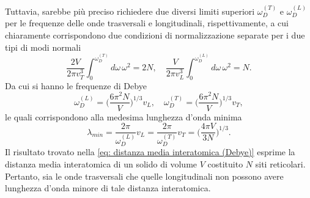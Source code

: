 Tuttavia, sarebbe più preciso richiedere due diversi limiti superiori $\omega_{D}^{(T)}$ e $\omega_D^{(L)}$ per le frequenze delle onde trasversali e longitudinali, rispettivamente, a cui chiaramente corrispondono due condizioni di normalizzazione separate per i due tipi di modi normali
\begin{equation}
    \frac{2V}{2\pi v_T^3}\int_0^{\omega_D^{(T)}}d\omega\,\omega^2 = 2N,\quad \frac{V}{2\pi v_L^3}\int_0^{\omega_D^{(L)}}d\omega\,\omega^2 = N.
\end{equation}
Da cui si hanno le frequenze di Debye
\begin{equation}
    \omega_D^{(L)} = \bigg(\frac{6\pi^2N}{V}\bigg)^{1/3}v_L,\quad \omega_D^{(T)} = \bigg(\frac{6\pi^2N}{V}\bigg)^{1/3}v_T,
\end{equation}
le quali corrispondono alla medesima lunghezza d'onda minima 
\begin{equation}
\label{eq: distanza media interatomica (Debye)}
    \lambda_{min} = \frac{2\pi}{\omega_D^{(L)}}v_L = \frac{2\pi}{\omega_D^{(T)}}v_T = \bigg(\frac{4\pi V}{3N}\bigg)^{1/3}.
\end{equation}
Il risultato trovato nella \eqref{eq: distanza media interatomica (Debye)} esprime la distanza media interatomica di un solido di volume $V$ costituito $N$ siti reticolari. Pertanto, sia le onde trasversali che quelle longitudinali non possono avere lunghezza d'onda minore di tale distanza interatomica. 

